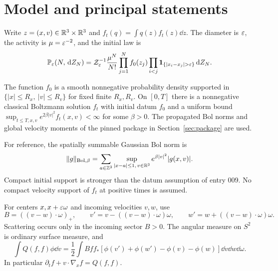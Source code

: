\section{Model and principal statements}\label{sec:statement}
Write $z=(x,v)\in\mathbb R^3\times\mathbb R^3$ and $f_t(q)=\int q(z)f_t(z)\dd z$.
The diameter is $\varepsilon$, the activity is $\mu=\varepsilon^{-2}$, and the initial law is
\begin{equation}\label{eq:ensemble}
 \Prob_\eps(N,\dd Z_N)=\mathcal Z_\eps^{-1}\frac{\mu^N}{N!}
 \prod_{j=1}^N f_0(z_j)
 \prod_{i<j}\ind_{\{|x_i-x_j|>\eps\}}\dd Z_N.
\end{equation}
\begin{assumption}\label{ass:model}
The function $f_0$ is a smooth nonnegative probability density supported in
$\{|x|\le R_x,\ |v|\le R_v\}$ for fixed finite $R_x,R_v$.
On $[0,T]$ there is a nonnegative classical Boltzmann solution $f_t$ with
initial datum $f_0$ and a uniform bound
$\sup_{t\le T,x,v}e^{2\beta|v|^2}f_t(x,v)<\infty$ for some $\beta>0$.
The propagated Bol norms and global velocity moments of the pinned package
in Section~\ref{sec:package} are used.
\end{assumption}
For reference, the spatially summable Gaussian Bol norm is
\[
 \|g\|_{\mathrm{Bol},\beta}
 =\sum_{a\in\mathbb Z^3}\sup_{|x-a|\le1,\,v\in\mathbb R^3}
                  e^{\beta|v|^2}|g(x,v)|.
\]
Compact initial support is stronger than the datum assumption of entry 009.
No compact velocity support of $f_t$ at positive times is assumed.

For centers $x,x+\varepsilon\omega$ and incoming velocities $v,w$, use
\begin{equation}\label{eq:collision}
 B=((v-w)\cdot\omega)_+,
 \qquad v'=v-((v-w)\cdot\omega)\omega,
 \qquad w'=w+((v-w)\cdot\omega)\omega.
\end{equation}
Scattering occurs only in the incoming sector $B>0$.
The angular measure on $S^2$ is ordinary surface measure, and
\[
 \int Q(f,f)\phi\dd v
 =\frac12\int Bff_*[\phi(v')+\phi(w')-\phi(v)-\phi(w)]
                 \dd v\dd w\dd\omega.
\]
In particular $\partial_t f+v\cdot\nabla_x f=Q(f,f)$.

